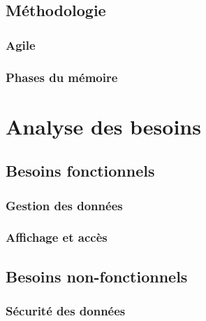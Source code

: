 \documentclass{EPL-master-thesis-covers-FR}
\begin{document}
		\section{Méthodologie}


			\subsection*{Agile}
			

				

			\subsection*{Phases du mémoire}

			

	\chapter{Analyse des besoins}
		\label{sec:analyse_besoins}


		\section{Besoins fonctionnels}

			

			\subsection*{Gestion des données}
				\label{sec:gest_donnee}



			\subsection*{Affichage et accès}

			

		\section{Besoins non-fonctionnels}


			\subsection*{Sécurité des données}
\end{document}
